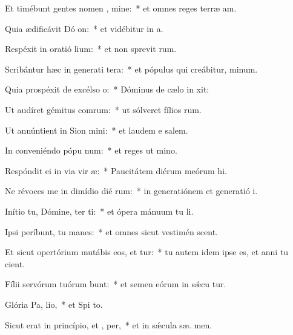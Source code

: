 \item Et timébunt gentes nomen , mine:~* et omnes reges terræ  am.
\item Quia ædificávit Dó on:~* et vidébitur in  a.
\item Respéxit in oratió lium:~* et non sprevit  rum.
\item Scribántur hæc in generati tera:~* et pópulus qui creábitur,  minum.
\item Quia prospéxit de excélso  o:~* Dóminus de cælo in  xit:
\item Ut audíret gémitus comrum:~* ut sólveret fílios rum.
\item Ut annúntient in Sion  mini:~* et laudem e  salem.
\item In conveniéndo pópu  num:~* et reges ut  mino.
\item Respóndit ei in via vir æ:~* Paucitátem diérum meórum  hi.
\item Ne révoces me in dimídio dié rum:~* in generatiónem et generatió  i.
\item Inítio tu, Dómine, ter ti:~* et ópera mánuum tu  li.
\item Ipsi períbunt, tu  manes:~* et omnes sicut vestimén scent.
\item Et sicut opertórium mutábis eos, et tur:~* tu autem idem ipse es, et anni tu  cient.
\item Fílii servórum tuórum bunt:~* et semen eórum in sǽcu tur.
\item Glória Pa,  lio,~* et Spi to.
\item Sicut erat in princípio, et ,  per,~* et in sǽcula sæ. men.
